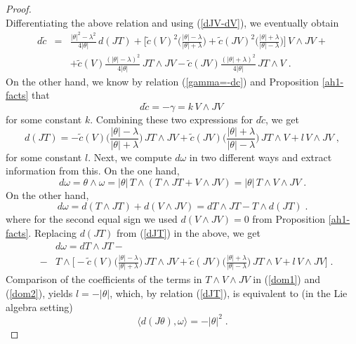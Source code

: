 \documentclass{amsart}
\begin{document}
\begin{proof}
\begin{equation}
\end{equation}
Differentiating the above relation and using (\ref{dJV-dV}), we eventually obtain
\begin{eqnarray} \label{dtc} \nonumber
d\tilde{c} &=& \frac{|\theta|^2 - \lambda^2}{4|\theta|} \, d(JT) + \Big[\tilde{c}(V)^2\Big(\frac{|\theta| - \lambda}{|\theta| + \lambda} \Big) + \tilde{c}(JV)^2\Big(\frac{|\theta| + \lambda}{|\theta| - \lambda} \Big) \Big] \, V \wedge JV + \\ \nonumber
& & + \tilde{c}(V) \frac{(|\theta| - \lambda)^2}{ 4|\theta| } \, JT \wedge JV - \tilde{c}(JV) \frac{(|\theta| + \lambda)^2}{ 4|\theta| } \, JT \wedge V \; .    
\end{eqnarray}
On the other hand, we know by relation (\ref{gamma=-dc}) and Proposition \ref{ah1-facts} that
$$ d\tilde{c} = - \gamma = k \, V \wedge JV \; $$
for some constant $k$. Combining these two expressions for $ d\tilde{c}$, we get
\begin{equation} \label{dJT}
d(JT) = - \tilde{c}(V) \Big(\frac{|\theta| - \lambda}{|\theta| + \lambda} \Big) \, JT \wedge JV + \tilde{c}(JV) \Big(\frac{|\theta| + \lambda}{|\theta| - \lambda} \Big) \, JT \wedge V + l \, V \wedge JV \; ,   
\end{equation}
for some constant $l$.
Next, we compute $d\omega$ in two different ways and extract information from this. On the one hand,
\begin{equation} \label{dom1}
   d\omega = \theta \wedge \omega = |\theta| \, T \wedge (T \wedge JT + V \wedge JV) = |\theta| \, T \wedge V \wedge JV \; . 
\end{equation}  
On the other hand,
$$ d\omega = d(T\wedge JT) + d(V \wedge JV) = dT \wedge JT - T \wedge d(JT) \; .$$
where for the second equal sign we used $d(V \wedge JV) = 0$ from Proposition \ref{ah1-facts}. Replacing $d(JT)$ from (\ref{dJT}) in the above, we get 
\begin{eqnarray} \label{dom2}
  & & d\omega = dT \wedge JT - \\ \nonumber
   &-& T \wedge \Big[ - \tilde{c}(V) \Big(\frac{|\theta| - \lambda}{|\theta| + \lambda} \Big) \, JT \wedge JV + \tilde{c}(JV) \Big(\frac{|\theta| + \lambda}{|\theta| - \lambda} \Big) \, JT \wedge V + l \, V \wedge JV \Big] \; . 
\end{eqnarray}
Comparison of the coefficients of the terms in $T \wedge V \wedge JV$ in (\ref{dom1}) and (\ref{dom2}), yields $l = - |\theta|$, which, by relation (\ref{dJT}), is equivalent to (in the Lie algebra setting)
$$ \langle d(J\theta) , \omega \rangle = - |\theta|^2 \; .$$

\end{proof}
\end{document}
